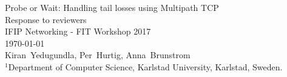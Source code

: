 \documentclass[a4paper,twoside,11pt]{reviewresponse}
\newcommand{\myAuthors}{{Kiran~Yedugundla, Per~Hurtig, Anna~Brunstrom}}
\newcommand{\myTitle}{Probe or Wait: Handling tail losses using Multipath TCP}
\newcommand{\myShortTitle}{Response to reviewers}
\newcommand{\myJournal}{IFIP Networking - FIT Workshop 2017}
\newcommand{\myDept}{{$^{\displaystyle 1}$Department of Computer Science, Karlstad University, Karlstad, Sweden. }}
\begin{document}
\thispagestyle{plain}

\begin{center}
 {\LARGE\myTitle} \vspace{0.5cm} \\
 {\large\myShortTitle} \vspace{0.5cm}\\
 {\large\myJournal} \vspace{0.5cm} \\
 \today \vspace{0.5cm} \\
 \myAuthors \\
 \small\myDept
\end{center}


\begin{abstract}
We thank the anonymous reviewers for their efforts and valuable feedback. 
In this document, we propose changes to the draft in response to comments/suggestions received from reviewers.

\end{abstract}

\clearpage
\end{document}
